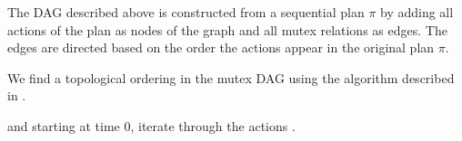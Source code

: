 The DAG described above is constructed
from a sequential plan $\pi$ by adding
all actions of the plan as nodes of the graph
and all mutex relations as edges.
The edges are directed based on the order the actions appear in the original plan $\pi$.

We find a topological ordering in the mutex DAG
using the algorithm described in \citet{Kahn1962}.





 and starting at time 0,
iterate through the actions
.


































